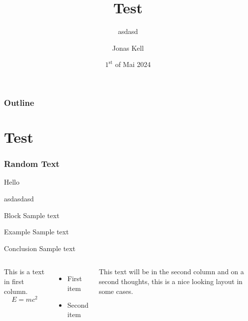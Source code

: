 \documentclass[aspectratio=169]{beamer}
\title[asd]{Test}
\subtitle{asdasd}
\author{Jonas Kell}
\institute[TP III]{Chair for theoretical Physics III}
\date[01.05.2024]{$1^{\text{st}}$ of Mai 2024}
\begin{document}
\maketitle

\begin{frame}
    \frametitle{Outline}

    \tableofcontents

\end{frame}

\section{Test}

\begin{frame}
    \frametitle{Random Text}

    Hello
    
    asdasdasd
\end{frame}

\begin{frame}
    \begin{block}{Block}
        Sample text
    \end{block}

    \begin{exampleblock}{Example}
        Sample text
    \end{exampleblock}

    \begin{alertblock}{Conclusion}
        Sample text
    \end{alertblock}
\end{frame}

\begin{frame}
    \begin{columns}
            This is a text in first column.
            $$E=mc^2$$
            \begin{itemize}
                \item First item
                \item Second item
            \end{itemize}
        
            This text will be in the second column
            and on a second thoughts, this is a nice looking
            layout in some cases.
    \end{columns}
\end{frame}
\end{document}
